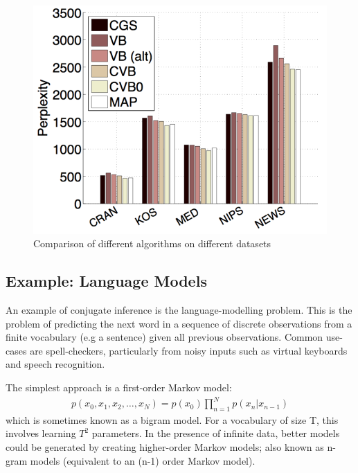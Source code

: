 \begin{figure}
  \centering
    \hspace*{-1.5cm}\includegraphics[height=0.33\textheight]{./Chap1/plots/figs/fig5.png}
  \caption{Comparison of different algorithms on different datasets}
  \label{fig:chap1-fig5}
\end{figure}

 
\subsection*{Example: Language Models}
 \label{sec:chap1:mackay-lang-model}
An example of conjugate inference is the language-modelling problem. This is the problem of predicting the next word in a sequence of discrete observations from a finite vocabulary (e.g a sentence) given all previous observations. Common use-cases are spell-checkers\cite{Brill2000}, particularly from noisy inputs such as virtual keyboards\cite{Ward2000a} and speech recognition\cite{Katz1987}\cite{Hannun2014}.

The simplest approach is a first-order Markov model:
\begin{align}
p(x_0, x_1, x_2, \ldots, x_N) = p(x_0)\prod_{n=1}^{N} p(x_n | x_{n-1})
\end{align}
which is sometimes known as a bigram model. For a vocabulary of size T, this involves learning $T^2$ parameters. In the presence of infinite data, better models could be generated by creating higher-order Markov models; also known as n-gram models (equivalent to an (n-1) order Markov model).

